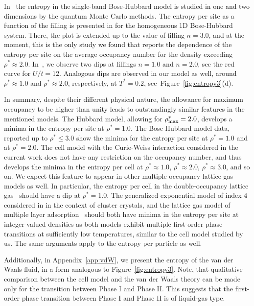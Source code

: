 \documentclass[entropy,article,submit,pdftex,moreauthors]{Definitions/mdpi}
\begin{document}
In~\citep{PKvHT08} the entropy in the single-band Bose-Hubbard model is studied in one and two dimensions by the quantum Monte Carlo methods. The entropy per site as a function of the filling is presented in \citep[Fig.~2]{PKvHT08} for the homogeneous 1D Bose-Hubbard system. There, the plot is extended up to the value of filling $n = 3.0$, and at the moment, this is the only study we found that reports the dependence of the entropy per site on the average occupancy number for the density exceeding $\rho^* \approx 2.0$. In~\citep[Fig.~2]{PKvHT08}, we observe two dips at fillings $n = 1.0$ and $n = 2.0$, see the red curve for $U/t = 12$. Analogous dips are observed in our model as well, around $\rho^* \approx 1.0$ and $\rho^* \approx 2.0$, respectively, at $T^*=0.2$, see~Figure~\ref{fig:entropy3}(d).

In summary, despite their different physical nature, the allowance for maximum occupancy to be higher than unity leads to outstandingly similar features in the mentioned models. The Hubbard model, allowing for $\rho^*_{\rm max} = 2.0$, develops a minima in the entropy per site at $\rho^* = 1.0$. The Bose-Hubbard model data, reported up to $\rho^* \leq 3.0$ show the minima for the entropy per site at $\rho^*=1.0$ and at $\rho^* = 2.0$. The cell model with the Curie-Weiss interaction considered in the current work does not have any restriction on the occupancy number, and thus develops the minima in the entropy per cell at $\rho^* \approx 1.0$, $\rho^* \approx 2.0$, $\rho^* \approx 3.0$, and so on. We expect this feature to appear in other multiple-occupancy lattice gas models as well. In particular, the entropy per cell in the double-occupancy lattice gas~\citep{LYZ21} should have a dip at $\rho^* = 1.0$. The generalized exponential model of index $4$ considered in \citep{Prestipino14,PGT15} in the context of cluster crystals, and the lattice gas model of multiple layer adsorption~\citep{dOG78} should both have minima in the entropy per site at integer-valued densities as both models exhibit multiple first-order phase transitions at sufficiently low temperatures, similar to the cell model studied by us. The same arguments apply to the entropy per particle as well.

Additionally, in Appendix~\ref{app:vdW}, we present the entropy of the van der Waals fluid, in a form analogous to Figure~\ref{fig:entropy3}. Note, that qualitative comparison between the cell model and the van der Waals theory can be made only for the transition between Phase I and Phase II. This suggests that the first-order phase transition between Phase I and Phase II is of liquid-gas type.
\end{document}
